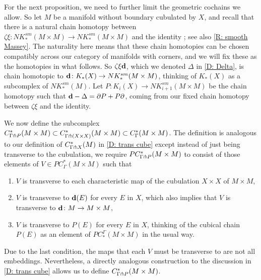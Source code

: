\documentclass{amsart}
\begin{document}
For the next proposition, we need to further limit the geometric cochains we allow.
So let $M$ be a manifold without boundary cubulated by $X$, and recall that there is a natural chain homotopy between $\zeta \xi \colon NK^{sm}_*(M \times M) \to  NK^{sm}_*(M \times M)$ and the identity  \cite[Section XI.5]{Mas91}; see also \cref{R: smooth Massey}.
The naturality here means that these chain homotopies can be chosen compatibly across our category of manifolds with corners, and we will fix these as the homotopies in what follows.
So $\zeta\xi \mathbf{d}$, which we denoted $\Delta$ in \cref{D: Delta}, is chain homotopic to $\mathbf{d} \colon K_*(X) \to NK^{sm}_*(M \times M)$, thinking of $K_*(X)$ as a subcomplex of $NK_*^{sm}(M)$.
Let $P \colon K_i(X) \to NK^{sm}_{i+1}(M \times M)$ be the chain homotopy such that $\mathbf{d} - \Delta = \partial P + P \partial$, coming from our fixed chain homotopy between $\zeta \xi$ and the identity.

We now define the subcomplex $C^*_{\Gamma \pitchfork P}(M \times M) \subset C^*_{\Gamma \pitchfork (X \times X)}(M \times M) \subset C^*_\Gamma(M \times M)$.
The definition is analogous to our definition of $C^*_{\Gamma \pitchfork X}(M)$ in \cref{D: trans cube} except instead of just being transverse to the cubulation, we require
$PC^*_{\Gamma \pitchfork P} (M \times M)$ to consist of those elements of $V \in PC^*_{\Gamma}(M \times M)$ such that
\begin{enumerate}
\item $V$ is transverse to each characteristic map of the cubulation $X \times X$ of $M \times M$,
\item $V$ is transverse to $\mathbf{d}(E)$ for every $E$ in $X$, which also implies that $V$ is transverse to $\mathbf{d} \colon M \to M \times M$,
\item $V$ is transverse to $P(E)$ for every $E$ in $X$, thinking of the cubical chain $P(E)$ as an element of $PC^\Gamma_*(M \times M)$ in the usual way.
\end{enumerate}

Due to the last condition, the maps that each $V$ must be transverse to are not all embeddings.
Nevertheless, a directly analogous construction to the discussion in \cref{D: trans cube} allows us to define $C^*_{\Gamma \pitchfork P} (M \times M)$.
\end{document}

